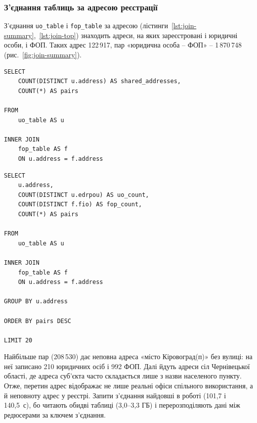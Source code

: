 \documentclass{iasa-lab}
\begin{document}

\subsubsection{З'єднання таблиць за адресою реєстрації}

З'єднання \texttt{uo\_table} і \texttt{fop\_table} за адресою (лістинги~\ref{lst:join-summary},~\ref{lst:join-top}) знаходить адреси, на яких зареєстровані і юридичні особи, і ФОП. Таких адрес 122\,917, пар «юридична особа -- ФОП» -- 1\,870\,748 (рис.~\ref{fig:join-summary}).

\begin{lstlisting}[language=HiveQL, caption={Кількість спільних адрес і пар}, label={lst:join-summary}]
SELECT
    COUNT(DISTINCT u.address) AS shared_addresses,
    COUNT(*) AS pairs

FROM
    uo_table AS u

INNER JOIN
    fop_table AS f
    ON u.address = f.address
\end{lstlisting}


\begin{lstlisting}[language=HiveQL, caption={Адреси з найбільшою кількістю пар}, label={lst:join-top}]
SELECT
    u.address,
    COUNT(DISTINCT u.edrpou) AS uo_count,
    COUNT(DISTINCT f.fio) AS fop_count,
    COUNT(*) AS pairs

FROM
    uo_table AS u

INNER JOIN
    fop_table AS f
    ON u.address = f.address

GROUP BY u.address

ORDER BY pairs DESC

LIMIT 20
\end{lstlisting}


Найбільше пар (208\,530) дає неповна адреса «місто Кіровоград(п)» без вулиці: на неї записано 210 юридичних осіб і 992 ФОП. Далі йдуть адреси сіл Чернівецької області, де адреса суб'єкта часто складається лише з назви населеного пункту. Отже, перетин адрес відображає не лише реальні офіси спільного використання, а й неповноту адрес у реєстрі. Запити з'єднання найдовші в роботі (101,7 і 140,5~с), бо читають обидві таблиці (3,0--3,3 ГБ) і перерозподіляють дані між редюсерами за ключем з'єднання.
\end{document}
